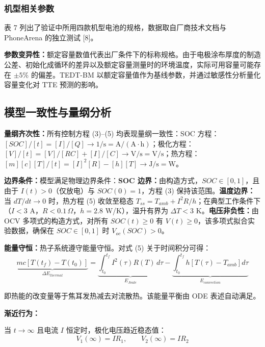 \documentclass[11pt,a4paper]{ctexart}
\begin{document}
\subsubsection{机型相关参数}

表 7 列出了验证中所用四款机型电池的规格，数据取自厂商技术文档与 PhoneArena 的独立测试 [8]。

\textbf{参数变异性：}额定容量数值代表出厂条件下的标称规格。由于电极涂布厚度的制造公差、初始化成循环的差异以及额定容量测量时的环境温度，实际可用容量可能存在 $\pm 5\%$ 的偏差。TEDT-BM 以额定容量值作为基线参数，并通过敏感性分析量化容量变化对 TTE 预测的影响。

\subsection{模型一致性与量纲分析}

\textbf{量纲齐次性：}所有控制方程 (3)--(5) 均表现量纲一致性：SOC 方程：$[SOC]/[t] = [I]/[Q] \rightarrow 1/\mathrm{s} = \mathrm{A}/(\mathrm{A}\cdot\mathrm{h})$；极化方程：$[V]/[t] = [V]/[RC] + [I]/[C] \rightarrow \mathrm{V}/\mathrm{s} = \mathrm{V}/\mathrm{s}$；热方程：$[m][c][T]/[t] = [I]^2[R] - [h][T] \rightarrow \mathrm{J}/\mathrm{s} = \mathrm{W}$。

\textbf{边界条件：}模型满足物理边界条件：\textbf{SOC 边界：}由构造方式，$SOC \in [0,1]$，且由于 $I(t) > 0$（仅放电）与 $SOC(0) = 1$，方程 (3) 保持该范围。\textbf{温度边界：}当 $dT/dt \rightarrow 0$ 时，热方程 (5) 收敛至稳态 $T_{ss} = T_{amb} + I^2R/h$；在典型工作条件下（$I < 3$ A，$R < 0.1\,\Omega$，$h = 2.8$ W/K），温升有界为 $\Delta T < 3$ K。\textbf{电压非负性：}由 OCV 多项式的构造方式，对所有 $SOC(t) \geq 0$ 有 $V(t) \geq 0$，该多项式拟合实验数据，确保在 $SOC \in [0,1]$ 时 $V_{oc}(SOC) > 0$。

\textbf{能量守恒：}热子系统遵守能量守恒。对式 (5) 关于时间积分可得：
\begin{equation}
\underbrace{mc\left[T(t_f) - T(t_0)\right]}_{\Delta E_{thermal}} = \underbrace{\int_{t_0}^{t_f}I^2(\tau)R(T)\,d\tau}_{E_{Joule}} - \underbrace{\int_{t_0}^{t_f}h\left[T(\tau) - T_{amb}\right]d\tau}_{E_{convection}} \tag{11}
\end{equation}

即热能的改变量等于焦耳发热减去对流散热。该能量平衡由 ODE 表述自动满足。

\textbf{渐近行为：}

当 $t \rightarrow \infty$ 且电流 $I$ 恒定时，极化电压趋近稳态值：
\begin{equation*}
V_1(\infty) = IR_1,\qquad V_2(\infty) = IR_2
\end{equation*}
\end{document}
